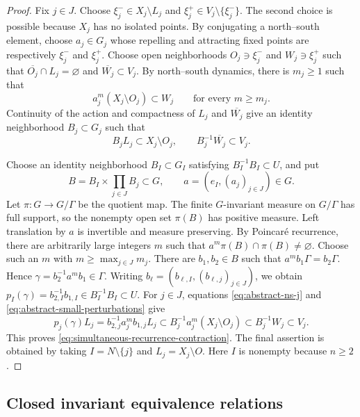 \documentclass[11pt]{amsart}
\numberwithin{equation}{section}
\theoremstyle{definition}
\begin{document}
	\begin{proof}
		Fix $j\in J$. Choose $\xi_j^-\in X_j\setminus L_j$ and
		$\xi_j^+\in V_j\setminus\{\xi_j^-\}$.
		The second choice is possible because $X_j$ has no isolated points.  By
		conjugating a north--south element, choose $a_j\in G_j$ whose repelling and
		attracting fixed points are respectively $\xi_j^-$ and $\xi_j^+$.  Choose open
		neighborhoods $O_j\ni\xi_j^-$ and $W_j\ni\xi_j^+$ such that
		$\overline{O_j}\cap L_j=\varnothing$ and $\overline{W_j}\subset V_j$.
		By north--south dynamics, there is $m_j\geq1$ such that
		\begin{equation}
			\label{eq:abstract-ns-j}
			a_j^m(X_j\setminus O_j)\subset W_j
			\qquad\text{for every }m\geq m_j.
		\end{equation}
		Continuity of the action and compactness of $L_j$ and $\overline{W_j}$ give an
		identity neighborhood $B_j\subset G_j$ such that
		\begin{equation}
			\label{eq:abstract-small-perturbations}
			B_jL_j\subset X_j\setminus O_j,
			\qquad
			B_j^{-1}\overline{W_j}\subset V_j.
		\end{equation}
		
		Choose an identity neighborhood $B_I\subset G_I$ satisfying
		$B_I^{-1}B_I\subset U$, and put
		\[
		B=B_I\times\prod_{j\in J}B_j\subset G,
		\qquad
		a=(e_I,(a_j)_{j\in J})\in G.
		\]
		Let $\pi:G\to G/\Gamma$ be the quotient map.  The finite $G$-invariant measure
		on $G/\Gamma$ has full support, so the nonempty open set $\pi(B)$ has positive
		measure.  Left translation by $a$ is invertible and measure preserving.  By
		Poincar\'e recurrence, there are arbitrarily large integers $m$ such that
		$a^m\pi(B)\cap\pi(B)\neq\varnothing$.
		Choose such an $m$ with $m\geq\max_{j\in J}m_j$.  There are $b_1,b_2\in B$ such
		that $a^mb_1\Gamma=b_2\Gamma$. Hence
		$\gamma=b_2^{-1}a^mb_1\in\Gamma$. Writing
		$b_\ell=(b_{\ell,I},(b_{\ell,j})_{j\in J})$, we obtain
		$p_I(\gamma)=b_{2,I}^{-1}b_{1,I}\in B_I^{-1}B_I\subset U$.
		For $j\in J$, equations \eqref{eq:abstract-ns-j} and
		\eqref{eq:abstract-small-perturbations} give
		\[p_j(\gamma)L_j
			=b_{2,j}^{-1}a_j^mb_{1,j}L_j
			\subset B_j^{-1}a_j^m(X_j\setminus O_j)
			\subset B_j^{-1}W_j
			\subset V_j.\]
		This proves \eqref{eq:simultaneous-recurrence-contraction}. The final assertion
		is obtained by taking $I=N\setminus\{j\}$ and $L_j=X_j\setminus O$. Here $I$ is
		nonempty because $n\geq2$.
	\end{proof}
	
	\subsection{Closed invariant equivalence relations}
	
\end{document}
